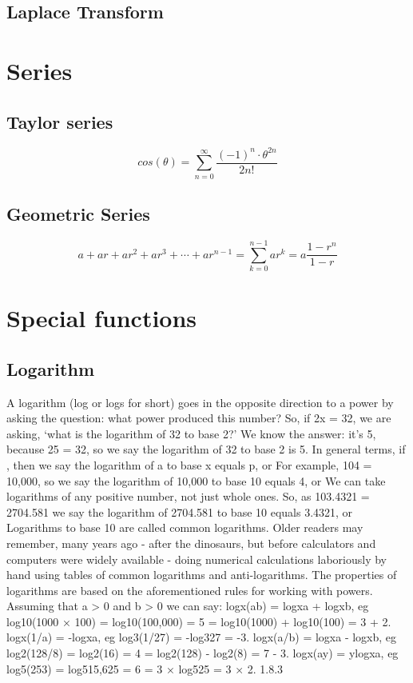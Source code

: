 \subsection{Laplace Transform}


\section{Series}

\subsection{Taylor series}
\begin{equation}
cos(\theta) = \sum_{n=0}^{\infty} \frac{(-1)^n \cdot \theta^{2n}}{2n!}
\end{equation}

\subsection{Geometric Series}
\begin{equation}
a + ar + ar^2 + ar^3 + \cdots + ar^{n-1} = \sum_{k=0}^{n-1}ar^k = a \frac{1-r^n}{1-r}
\end{equation}



\section{Special functions}
\subsection{Logarithm}
A logarithm (log or logs for short) goes in the opposite direction to a power by asking the question: what power produced this number? So, if 2x = 32, we are asking, ‘what is the logarithm of 32 to base 2?’ We know the answer: it's 5, because 25 = 32, so we say the logarithm of 32 to base 2 is 5. In general terms, if , then we say the logarithm of a to base x equals p, or For example, 104 = 10,000, so we say the logarithm of 10,000 to base 10 equals 4, or We can take logarithms of any positive number, not just whole ones. So, as 103.4321 = 2704.581 we say the logarithm of 2704.581 to base 10 equals 3.4321, or Logarithms to base 10 are called common logarithms. Older readers may remember, many years ago - after the dinosaurs, but before calculators and computers were widely available - doing numerical calculations laboriously by hand using tables of common logarithms and anti-logarithms. The properties of logarithms are based on the aforementioned rules for working with powers. Assuming that a > 0 and b > 0 we can say: logx(ab) = logxa + logxb, eg log10(1000 × 100) = log10(100,000) = 5 = log10(1000) + log10(100) = 3 + 2. logx(1/a) = -logxa, eg log3(1/27) = -log327 = -3. logx(a/b) = logxa - logxb, eg log2(128/8) = log2(16) = 4 = log2(128) - log2(8) = 7 - 3. logx(ay) = ylogxa, eg log5(253) = log515,625 = 6 = 3 × log525 = 3 × 2. 1.8.3

